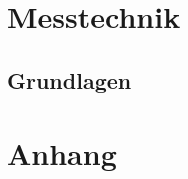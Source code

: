 \documentclass[a5paper]{report}
\begin{document}
	\part{Messtechnik}
	
		\chapter{Grundlagen}
		

%
%
\renewcommand{\indexname}{Sachregister}
\part{Anhang}
\printindex
\end{document}
